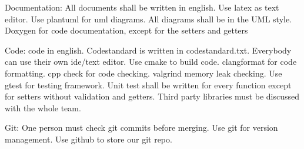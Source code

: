 Documentation:
All documents shall be written in english.
Use latex as text editor.
Use plantuml for uml diagrams. All diagrams shall be in the UML style.
Doxygen for code documentation, except for the setters and getters

Code:
code in english.
Codestandard is written in codestandard.txt.
Everybody can use their own ide/text editor.
Use cmake to build code.
clangformat for code formatting.
cpp check for code checking.
valgrind memory leak checking.
Use gtest for testing framework.
Unit test shall be written for every function except for setters without validation and getters.
Third party libraries must be discussed with the whole team.

Git:
One person must check git commits before merging.
Use git for version management. Use github to store our git repo.


